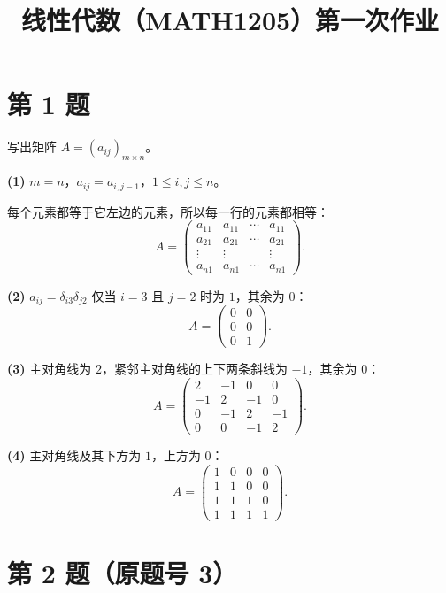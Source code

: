 \documentclass[11pt,a4paper]{ctexart}
\title{线性代数（MATH1205）第一次作业}
\author{}
\date{}
\newenvironment{problem}[1]
  {\par\medskip\noindent\textbf{#1}\quad}
  {\par}
\begin{document}
\maketitle
\vspace{-3em}

\section*{第 1 题}

\begin{problem}{}写出矩阵 $A=(a_{ij})_{m\times n}$。\end{problem}

\textbf{(1)} $m=n$，$a_{ij}=a_{i,j-1}$，$1\le i,j\le n$。

每个元素都等于它左边的元素，所以每一行的元素都相等：
\[
A=\begin{pmatrix}
a_{11} & a_{11} & \cdots & a_{11}\\
a_{21} & a_{21} & \cdots & a_{21}\\
\vdots & \vdots & & \vdots\\
a_{n1} & a_{n1} & \cdots & a_{n1}
\end{pmatrix}.
\]

\textbf{(2)} $a_{ij}=\delta_{i3}\delta_{j2}$ 仅当 $i=3$ 且 $j=2$ 时为 $1$，其余为 $0$：
\[
A=\begin{pmatrix}0&0\\0&0\\0&1\end{pmatrix}.
\]

\textbf{(3)} 主对角线为 $2$，紧邻主对角线的上下两条斜线为 $-1$，其余为 $0$：
\[
A=\begin{pmatrix}
2&-1&0&0\\
-1&2&-1&0\\
0&-1&2&-1\\
0&0&-1&2
\end{pmatrix}.
\]

\textbf{(4)} 主对角线及其下方为 $1$，上方为 $0$：
\[
A=\begin{pmatrix}
1&0&0&0\\
1&1&0&0\\
1&1&1&0\\
1&1&1&1
\end{pmatrix}.
\]

\section*{第 2 题（原题号 3）}
\end{document}
